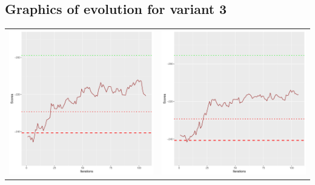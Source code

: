 \documentclass[]{scrartcl}
\begin{document}
\clearpage

\subsection{Graphics of evolution for variant 3}

\begin{table}[h!]
\begin{tabular}{cc}
\includegraphics[scale = 0.4]{./figs/asia/v3/10/boundsEvolution-107.pdf} & 
\includegraphics[scale = 0.4]{./figs/asia/v3/20/boundsEvolution-107.pdf} \\

\end{tabular}
\end{table}
\end{document}
